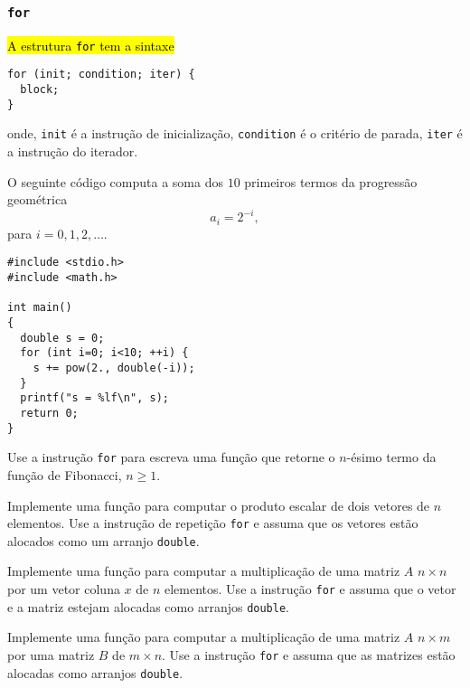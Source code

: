 \documentclass[12pt]{article}
\begin{document}
\subsubsection{\texttt{for}}

\hl{A estrutura \texttt{for} tem a sintaxe}
\begin{lstlisting}
for (init; condition; iter) {
  block;
}
\end{lstlisting}
onde, \lstinline!init! é a instrução de inicialização, \lstinline+condition+ é o critério de parada, \lstinline+iter+ é a instrução do iterador.

\begin{ex}
  O seguinte código computa a soma dos $10$ primeiros termos da progressão geométrica
  \begin{equation}
    a_i = 2^{-i},
  \end{equation}
  para $i = 0, 1, 2, \ldots$.
\begin{lstlisting}
#include <stdio.h>
#include <math.h>

int main()
{
  double s = 0;
  for (int i=0; i<10; ++i) {
    s += pow(2., double(-i));
  }
  printf("s = %lf\n", s);
  return 0;
}
\end{lstlisting}
\end{ex}

\begin{exr}
  Use a instrução \lstinline!for! para escreva uma função que retorne o $n$-ésimo termo da função de Fibonacci{\fibonacci}, $n\geq 1$.
\end{exr}

\begin{exr}
  Implemente uma função para computar o produto escalar de dois vetores de $n$ elementos. Use a instrução de repetição \lstinline!for! e assuma que os vetores estão alocados como um arranjo \lstinline!double!.
\end{exr}

\begin{exr}
  Implemente uma função para computar a multiplicação de uma matriz $A$ $n\times n$ por um vetor coluna $x$ de $n$ elementos. Use a instrução \lstinline!for! e assuma que o vetor e a matriz estejam alocadas como arranjos \lstinline!double!.
\end{exr}

\begin{exr}
  Implemente uma função para computar a multiplicação de uma matriz $A$ $n\times m$ por uma matriz $B$ de $m\times n$. Use a instrução \lstinline!for! e assuma que as matrizes estão alocadas como arranjos \lstinline+double+.
\end{exr}
\end{document}
